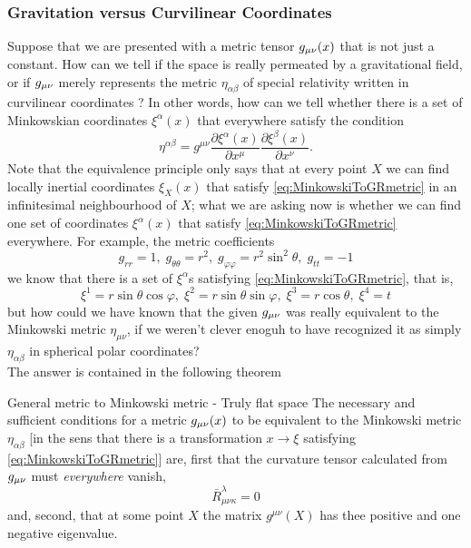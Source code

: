 \subsubsection{Gravitation versus Curvilinear Coordinates}
Suppose that we are presented with a metric tensor $g_{\mu \nu}(x)$ that is not just a constant. How can we tell if the space is really permeated by a gravitational field, or if $g_{\mu \nu}$ merely represents the metric $\eta_{\alpha \beta}$ of special relativity written in curvilinear coordinates ? In other words, how can we tell whether there is a set of Minkowskian coordinates $\xi^\alpha(x)$ that everywhere satisfy the condition
\begin{equation}
	\label{eq:MinkowskiToGRmetric}
	\eta^{\alpha \beta} = g^{\mu \nu} \frac{\partial \xi^\alpha(x)}{\partial x^\mu} \frac{\partial \xi^\beta(x)}{\partial x^\nu}.
\end{equation}
Note that the equivalence principle only says that at every point $X$ we can find locally inertial coordinates $\xi_X(x)$ that satisfy \ref{eq:MinkowskiToGRmetric} in an infinitesimal neighbourhood of $X$; what we are asking now is whether we can find one set of coordinates $\xi^\alpha(x)$ that satisfy \ref{eq:MinkowskiToGRmetric} everywhere. For example, the metric coefficients
\begin{equation}
	g_{rr}=1,\; g_{\theta \theta}=r^2, \; g_{\varphi \varphi}= r^2 \sin^2 \theta, \; g_{tt} =-1
\end{equation}
we know that there is a set of $\xi^\alpha$s satisfying \ref{eq:MinkowskiToGRmetric}, that is,
\begin{equation}
	\xi^1=r \sin \theta \cos \varphi , \; \xi^2 = r \sin\theta \sin \varphi, \; \xi^3 = r\cos \theta, \; \xi^4 = t
\end{equation}
but how could we have known that the given $g_{\mu \nu}$ was really equivalent to the Minkowski metric $\eta_{\mu \nu}$, if we weren't clever enoguh to have recognized it as simply $\eta_{\alpha \beta}$ in spherical polar coordinates?\\
The answer is contained in the following theorem
\begin{mybox}{General metric to Minkowski metric -  Truly flat space}
	The necessary and sufficient conditions for a metric $g_{\mu \nu}(x)$ to be equivalent to the Minkowski metric $\eta_{\alpha \beta}$ [in the sens that there is a transformation $x\rightarrow \xi$ satisfying \ref{eq:MinkowskiToGRmetric}] are, first that the curvature tensor calculated from $g_{\mu \nu}$ must \emph{everywhere} vanish,
	\begin{equation}
		\bar{R}^\lambda_{\mu\nu\kappa}=0
	\end{equation}
	and, second, that at some point $X$ the matrix $g^{\mu \nu}(X)$ has thee positive and one negative eigenvalue.
\end{mybox}
